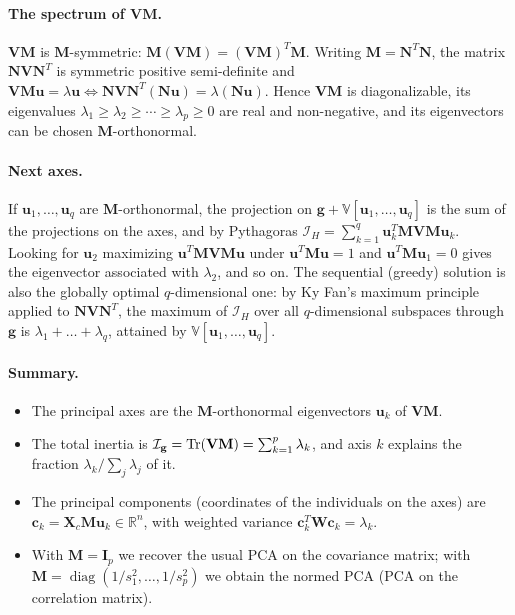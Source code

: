 \begin{notechapter}
\paragraph{The spectrum of $\mathbf{V}\mathbf{M}$.}
$\mathbf{V}\mathbf{M}$ is $\mathbf{M}$-symmetric: $\mathbf{M}(\mathbf{V}\mathbf{M}) = (\mathbf{V}\mathbf{M})^T\mathbf{M}$.
Writing $\mathbf{M} = \mathbf{N}^T\mathbf{N}$, the matrix $\mathbf{N}\mathbf{V}\mathbf{N}^T$ is symmetric positive
semi-definite and $\mathbf{V}\mathbf{M}\mathbf{u} = \lambda\mathbf{u} \iff \mathbf{N}\mathbf{V}\mathbf{N}^T(\mathbf{N}\mathbf{u}) = \lambda(\mathbf{N}\mathbf{u})$.
Hence $\mathbf{V}\mathbf{M}$ is diagonalizable, its eigenvalues
$\lambda_1 \ge \lambda_2 \ge \cdots \ge \lambda_p \ge 0$ are real and non-negative, and its
eigenvectors can be chosen $\mathbf{M}$-orthonormal.

\paragraph{Next axes.}
If $\mathbf{u}_1,\dots,\mathbf{u}_q$ are $\mathbf{M}$-orthonormal, the projection on
$\mathbf{g}+\mathbb{V}[\mathbf{u}_1,\dots,\mathbf{u}_q]$ is the sum of the projections on the axes, and by
Pythagoras $\mathcal{I}_H = \sum_{k=1}^q \mathbf{u}_k^T\mathbf{M}\mathbf{V}\mathbf{M}\mathbf{u}_k$.
Looking for $\mathbf{u}_2$ maximizing $\mathbf{u}^T\mathbf{M}\mathbf{V}\mathbf{M}\mathbf{u}$ under
$\mathbf{u}^T\mathbf{M}\mathbf{u}=1$ and $\mathbf{u}^T\mathbf{M}\mathbf{u}_1 = 0$ gives the eigenvector associated
with $\lambda_2$, and so on. The sequential (greedy) solution is also the globally optimal
$q$-dimensional one: by Ky Fan's maximum principle applied to $\mathbf{N}\mathbf{V}\mathbf{N}^T$, the maximum
of $\mathcal{I}_H$ over all $q$-dimensional subspaces through $\mathbf{g}$ is $\lambda_1 + \dots + \lambda_q$,
attained by $\mathbb{V}[\mathbf{u}_1,\dots,\mathbf{u}_q]$.

\paragraph{Summary.}
\begin{itemize}
  \item The principal axes are the $\mathbf{M}$-orthonormal eigenvectors $\mathbf{u}_k$ of $\mathbf{V}\mathbf{M}$.
  \item The total inertia is $\mathcal{I}_{\mathbf{g}} = \operatorname{Tr}(\mathbf{V}\mathbf{M}) = \sum_{k=1}^p \lambda_k$, and
        axis $k$ explains the fraction $\lambda_k / \sum_j \lambda_j$ of it.
  \item The principal components (coordinates of the individuals on the axes) are
        $\mathbf{c}_k = \mathbf{X}_c \mathbf{M} \mathbf{u}_k \in \mathbb{R}^n$, with weighted variance
        $\mathbf{c}_k^T \mathbf{W} \mathbf{c}_k = \lambda_k$.
  \item With $\mathbf{M} = \mathbf{I}_p$ we recover the usual PCA on the covariance matrix; with
        $\mathbf{M} = \operatorname{diag}(1/s_1^2,\dots,1/s_p^2)$ we obtain the normed PCA (PCA on the correlation matrix).
\end{itemize}


\end{notechapter}
